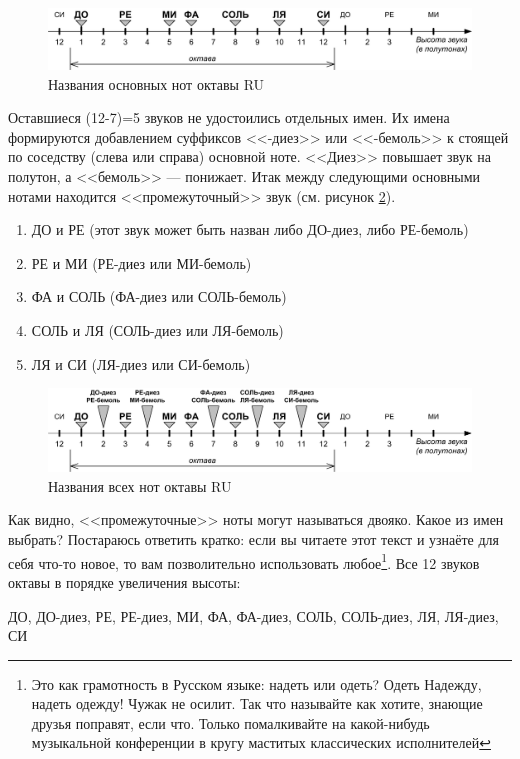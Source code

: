 \begin{figure}[!ht]
    \centering
    \includegraphics[width=\textwidth]{fig/notes/notes-main-ru} 
    \caption{Названия основных нот октавы RU}\label{fig:notes:names:main:RU}
\end{figure} 

Оставшиеся (12-7)=5 звуков не удостоились отдельных имен. Их имена формируются добавлением суффиксов <<-диез>> или <<-бемоль>> к стоящей по соседству (слева или справа) основной ноте. <<Диез>> повышает звук на полутон, а <<бемоль>> --- понижает. Итак между следующими основными нотами находится <<промежуточный>> звук (см. рисунок \ref{fig:notes:names:all:RU}).
\begin{enumerate}
    \item ДО и РЕ (этот звук может быть назван либо ДО-диез, либо РЕ-бемоль)
    \item РЕ и МИ (РЕ-диез или МИ-бемоль)
    \item ФА и СОЛЬ (ФА-диез или СОЛЬ-бемоль)
    \item СОЛЬ и ЛЯ (СОЛЬ-диез или ЛЯ-бемоль)
    \item ЛЯ и СИ (ЛЯ-диез или СИ-бемоль)
\end{enumerate}

\begin{figure}[!ht]
    \centering
    \includegraphics[width=\textwidth]{fig/notes/notes-all-ru} 
    \caption{Названия всех нот октавы RU}\label{fig:notes:names:all:RU}
\end{figure} 

Как видно, <<промежуточные>> ноты могут называться двояко. Какое из имен выбрать? Постараюсь ответить кратко: если вы читаете этот текст и узнаёте для себя что-то новое, то вам позволительно использовать любое\footnote{Это как грамотность в Русском языке: надеть или одеть? Одеть Надежду, надеть одежду! Чужак не осилит. Так что называйте как хотите, знающие друзья поправят, если что. Только помалкивайте на какой-нибудь музыкальной конференции в кругу маститых классических исполнителей}. Все 12 звуков октавы в порядке увеличения высоты:
\begin{center}
    ДО, ДО-диез, РЕ, РЕ-диез, МИ, ФА, ФА-диез, СОЛЬ, СОЛЬ-диез, ЛЯ, ЛЯ-диез, СИ
\end{center}

